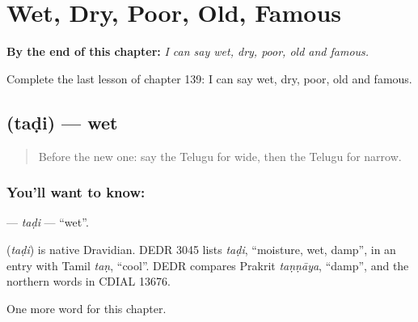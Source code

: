 
\chapter{Wet, Dry, Poor, Old, Famous}
\label{ch:te-wet-dry-poor-old-famous}

\begin{chapteropening}
\textbf{By the end of this chapter:} \emph{I can say wet, dry, poor, old and famous.}

Complete the last lesson of chapter 139: I can say wet, dry, poor, old and famous.
\end{chapteropening}

\section[\texorpdfstring{\te{తడి} (taḍi)}{తడి (taḍi)}]{ (taḍi) — wet}

\label{lesson:TE-C139-tadi}



\begin{quote}
Before the new one: say the Telugu for wide, then the Telugu for narrow.
\end{quote}

\subsection*{You'll want to know: }
\textbf{} — \emph{taḍi} — \textquotedblleft{}wet\textquotedblright{}.

\begin{cousinweb}
\textbf{} (\emph{taḍi}) is native Dravidian. DEDR 3045 lists \emph{taḍi}, \textquotedblleft{}moisture, wet, damp\textquotedblright{}, in an entry with Tamil \emph{taṇ}, \textquotedblleft{}cool\textquotedblright{}. DEDR compares Prakrit \emph{taṇṇāya}, \textquotedblleft{}damp\textquotedblright{}, and the northern words in CDIAL 13676.
\end{cousinweb}

\begin{grammarlens}[title={What you've built}]
One more word for this chapter.
\end{grammarlens}

